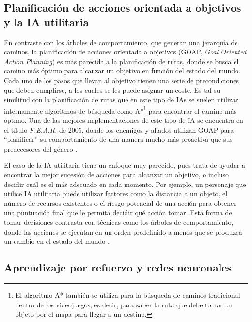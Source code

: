 \subsection{Planificación de acciones orientada a objetivos y la IA utilitaria}

En contraste con los árboles de comportamiento, que generan una jerarquía de caminos, la planificación de acciones orientada a objetivos (GOAP, \textit{Goal Oriented Action Planning}) es más parecida a la planificación de rutas, donde se busca el camino más óptimo para alcanzar un objetivo en función del estado del mundo. Cada uno de los pasos que llevan al objetivo tienen una serie de precondiciones que deben cumplirse, a los cuales se les puede asignar un coste. Es tal su similitud con la planificación de rutas que en este tipo de IAs se suelen utilizar internamente algoritmos de búsqueda como A*\footnote{El algoritmo A* también se utiliza para la búsqueda de caminos tradicional dentro de los videojuegos, es decir, para saber la ruta que debe tomar un objeto por el mapa para llegar a un destino.} para encontrar el camino más óptimo. Una de las mejores implementaciones de este tipo de IA se encuentra en el título \textit{F.E.A.R.} de 2005, donde los enemigos y aliados utilizan GOAP para ``planificar'' su comportamiento de una manera mucho más proactiva que sus predecesores del género \cite{jeff_gdc_2006}.

El caso de la IA utilitaria tiene un enfoque muy parecido, pues trata de ayudar a encontrar la mejor sucesión de acciones para alcanzar un objetivo, o incluso decidir cuál es el más adecuado en cada momento. Por ejemplo, un personaje que utilice IA utilitaria puede utilizar factores como la distancia a un objeto, el número de recursos existentes o el riesgo potencial de una acción para obtener una puntuación final que le permita decidir qué acción tomar. Esta forma de tomar decisiones contrasta con técnicas como los árboles de comportamiento, donde las acciones se ejecutan en un orden predefinido a menos que se produzca un cambio en el estado del mundo \cite{thompson_ai_2024}.

\subsection{Aprendizaje por refuerzo y redes neuronales}

